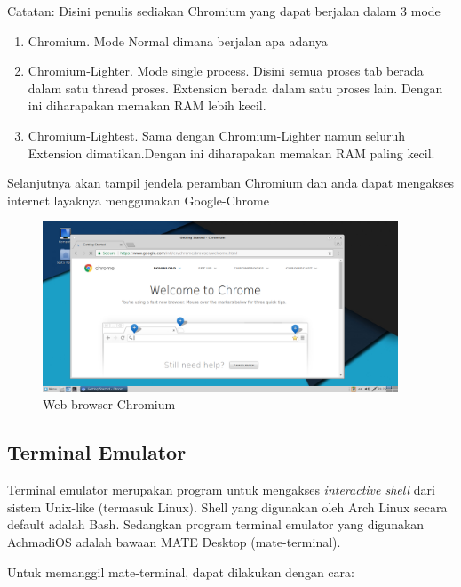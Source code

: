 \documentclass[12pt,]{article}
\begin{document}
	Catatan: Disini penulis sediakan Chromium yang dapat berjalan dalam 3 mode
	\begin{enumerate}
		\item Chromium. Mode Normal dimana berjalan apa adanya
		\item Chromium-Lighter. Mode single process. Disini semua proses tab berada dalam satu thread proses. Extension berada dalam satu proses lain. Dengan ini diharapakan memakan RAM lebih kecil.
		\item Chromium-Lightest. Sama dengan Chromium-Lighter namun seluruh Extension dimatikan.Dengan ini diharapakan memakan RAM paling kecil.
	\end{enumerate}

	Selanjutnya akan tampil jendela peramban Chromium dan anda dapat mengakses internet layaknya menggunakan Google-Chrome
	\begin{figure}[!ht]
		\centering
		\includegraphics[width=300pt]{png/chromium}
		\caption{Web-browser Chromium}
	\end{figure}

	\newpage
	\subsection{Terminal Emulator}
	
	Terminal emulator merupakan program untuk mengakses \textit{interactive shell} dari sistem Unix-like (termasuk Linux).
	Shell yang digunakan oleh Arch Linux secara default adalah Bash.
	Sedangkan program terminal emulator yang digunakan AchmadiOS adalah bawaan MATE Desktop (mate-terminal). 
	
	Untuk memanggil mate-terminal, dapat dilakukan dengan cara:
	
\end{document}
